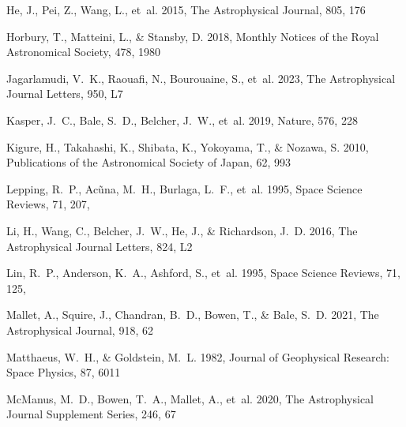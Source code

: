 \documentclass[twocolumn, times]{aastex631}
\begin{document}
\begin{thebibliography}{}
He, J., Pei, Z., Wang, L., {et~al.} 2015, The Astrophysical Journal, 805, 176

Horbury, T., Matteini, L., \& Stansby, D. 2018, Monthly Notices of the Royal Astronomical Society, 478, 1980

Jagarlamudi, V.~K., Raouafi, N., Bourouaine, S., {et~al.} 2023, The Astrophysical Journal Letters, 950, L7

Kasper, J.~C., Bale, S.~D., Belcher, J.~W., {et~al.} 2019, Nature, 576, 228

Kigure, H., Takahashi, K., Shibata, K., Yokoyama, T., \& Nozawa, S. 2010, Publications of the Astronomical Society of Japan, 62, 993

Lepping, R.~P., Ac{\~u}na, M.~H., Burlaga, L.~F., {et~al.} 1995, Space Science Reviews, 71, 207, 

Li, H., Wang, C., Belcher, J.~W., He, J., \& Richardson, J.~D. 2016, The Astrophysical Journal Letters, 824, L2

Lin, R.~P., Anderson, K.~A., Ashford, S., {et~al.} 1995, Space Science Reviews, 71, 125, 

Mallet, A., Squire, J., Chandran, B.~D., Bowen, T., \& Bale, S.~D. 2021, The Astrophysical Journal, 918, 62

Matthaeus, W.~H., \& Goldstein, M.~L. 1982, Journal of Geophysical Research: Space Physics, 87, 6011

McManus, M.~D., Bowen, T.~A., Mallet, A., {et~al.} 2020, The Astrophysical Journal Supplement Series, 246, 67


\end{thebibliography}
\end{document}
